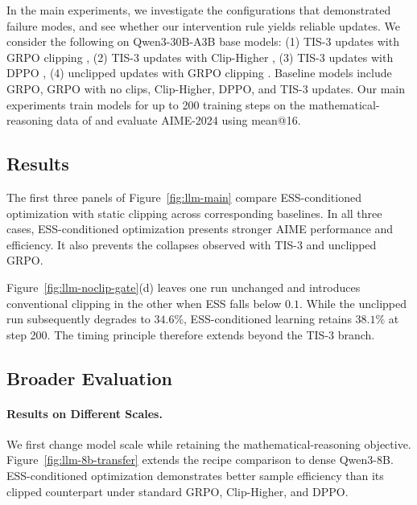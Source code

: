 \documentclass[11pt]{article}
\theoremstyle{remark}
\begin{document}
In the main experiments, we investigate the configurations that demonstrated failure modes, and see whether our intervention rule yields reliable updates. We consider the following on Qwen3-30B-A3B base models: (1) TIS-3 updates with GRPO clipping \citep{shao2024deepseekmath}, (2) TIS-3 updates with Clip-Higher \citep{yu2025dapo}, (3) TIS-3 updates with DPPO \citep{qi2026dppo}, (4) unclipped updates with GRPO clipping \citep{shao2024deepseekmath}. Baseline models include GRPO, GRPO with no clips, Clip-Higher, DPPO, and TIS-3 updates. Our main experiments train models for up to 200 training steps on the mathematical-reasoning data of \citet{yu2025dapo} and evaluate AIME-2024 using mean@16.


\subsection{Results}
\label{sec:llm-experiments}
The first three panels of Figure~\ref{fig:llm-main} compare ESS-conditioned optimization with static clipping across corresponding baselines. In all three cases, ESS-conditioned optimization presents stronger AIME performance and efficiency. It also prevents the collapses observed with TIS-3 and unclipped GRPO.


Figure~\ref{fig:llm-noclip-gate}(d) leaves one run
unchanged and introduces conventional clipping in the other when ESS falls below $0.1$. While the unclipped run subsequently degrades to $34.6\%$, ESS-conditioned learning retains $38.1\%$ at step 200. The timing principle therefore extends beyond the TIS-3 branch. 

\subsection{Broader Evaluation}

\paragraph{Results on Different Scales.}
We first change model scale while retaining the
mathematical-reasoning objective. Figure~\ref{fig:llm-8b-transfer} extends the recipe comparison to dense Qwen3-8B. ESS-conditioned optimization demonstrates better sample efficiency than its clipped counterpart under standard GRPO, Clip-Higher, and DPPO.
\end{document}
